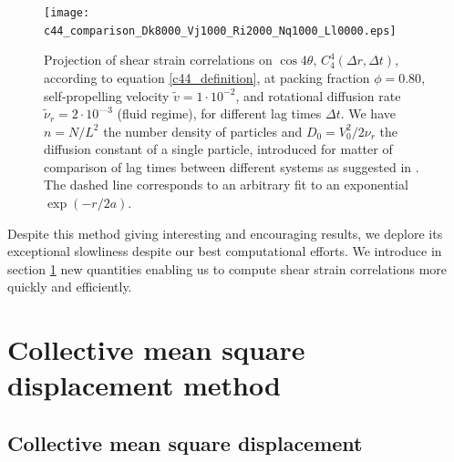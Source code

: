 \documentclass[class=report, float=false, crop=false]{standalone}
\begin{document}
\begin{figure}[H]
\centering
\texttt{[image: c44\_comparison\_Dk8000\_Vj1000\_Ri2000\_Nq1000\_Ll0000.eps]}
\caption{Projection of shear strain correlations on $\cos4\theta$, $C_4^4(\Delta r, \Delta t)$, according to equation \ref{c44_definition}, at packing fraction $\phi = 0.80$, self-propelling velocity $\tilde{v} = 1\cdot10^{-2}$, and rotational diffusion rate $\tilde{\nu}_r = 2\cdot10^{—3}$ (fluid regime), for different lag times $\Delta t$. We have $n = N/L^2$ the number density of particles and $D_0 = V_0^2/2\nu_r$ the diffusion constant of a single particle, introduced for matter of comparison of lag times between different systems as suggested in \cite{illing2016strain}. The dashed line corresponds to an arbitrary fit to an exponential $\exp(-r/2a)$.}
\label{c44_real_fluid}
\end{figure}


Despite this method giving interesting and encouraging results, we deplore its exceptional slowliness despite our best computational efforts. We introduce in section \ref{section:collective_mean_square_displacement_method} new quantities enabling us to compute shear strain correlations more quickly and efficiently.

\section{Collective mean square displacement method}
\label{section:collective_mean_square_displacement_method}

\subsection{Collective mean square displacement}

\end{document}

